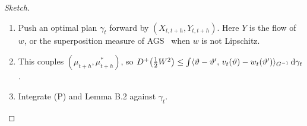 \begin{proof}[Sketch]
\leavevmode
\begin{enumerate}[label=\arabic*.]
\item Push an optimal plan $\gamma_t$ forward by $(X_{t,t+h},Y_{t,t+h})$. Here $Y$ is the flow of $w$, or the
  superposition measure of AGS~\cite[Thm.~8.2.1]{ags2008} when $w$ is not Lipschitz.
\item This couples $(\mu_{t+h},\mu^*_{t+h})$, so
  $D^+\bigl(\frac12W^2\bigr)\le\int\langle \vartheta-\vartheta',\, v_t(\vartheta)-w_t(\vartheta')\rangle_{G^{-1}}\,\mathrm{d}\gamma_t$.
\item Integrate (P) and Lemma B.2 against $\gamma_t$.\qedhere
\end{enumerate}
\end{proof}
